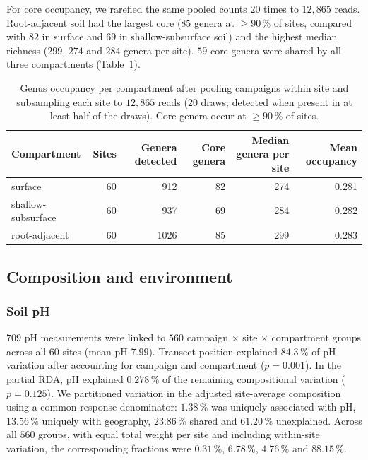 \documentclass[11pt]{article}
\begin{document}
For core occupancy, we rarefied the same pooled counts $20$ times to $12{,}865$ reads. Root-adjacent soil had the largest core ($85$ genera at $\geq 90\,\%$ of sites, compared with $82$ in surface and $69$ in shallow-subsurface soil) and the highest median richness ($299$, $274$ and $284$ genera per site). $59$ core genera were shared by all three compartments (Table~\ref{tab:core_genera}).

\begin{table}[htbp]
\centering\footnotesize
\caption{Genus occupancy per compartment after pooling campaigns within site and subsampling each site to $12{,}865$ reads ($20$ draws; detected when present in at least half of the draws). Core genera occur at $\geq 90\,\%$ of sites.}
\label{tab:core_genera}
\begin{tabular}{lrrrrr}
\toprule
Compartment & Sites & Genera detected & Core genera & Median genera per site & Mean occupancy \\
\midrule
surface & 60 & 912 & 82 & 274 & 0.281 \\
shallow-subsurface & 60 & 937 & 69 & 284 & 0.282 \\
root-adjacent & 60 & 1026 & 85 & 299 & 0.283 \\
\bottomrule
\end{tabular}
\end{table}


\subsection{Composition and environment}\label{sup:beta_environment}

\subsubsection{Soil pH}\label{sup:beta_ph}
$709$ pH measurements were linked to $560$ campaign $\times$ site $\times$ compartment groups across all $60$ sites (mean pH $7.99$). Transect position explained $84.3\,\%$ of pH variation after accounting for campaign and compartment ($p=0.001$). In the partial RDA, pH explained $0.278\,\%$ of the remaining compositional variation ($p=0.125$). We partitioned variation in the adjusted site-average composition using a common response denominator: $1.38\,\%$ was uniquely associated with pH, $13.56\,\%$ uniquely with geography, $23.86\,\%$ shared and $61.20\,\%$ unexplained. Across all $560$ groups, with equal total weight per site and including within-site variation, the corresponding fractions were $0.31\,\%$, $6.78\,\%$, $4.76\,\%$ and $88.15\,\%$.
\end{document}
